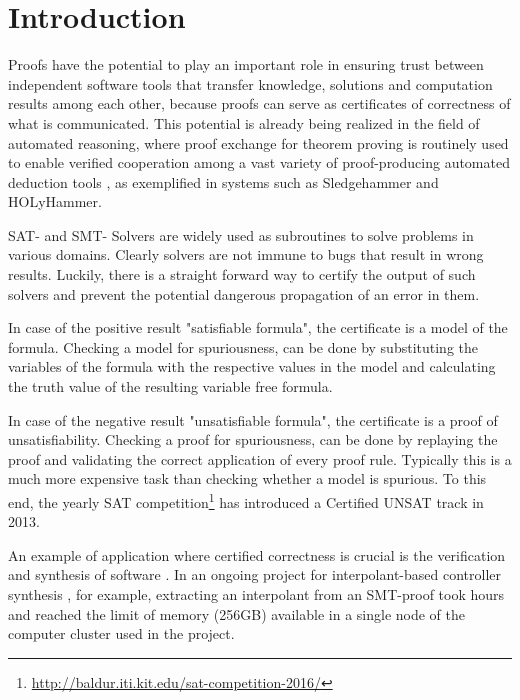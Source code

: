 \section{Introduction}

Proofs have the potential to play an important role in ensuring trust
between independent software tools that transfer knowledge, solutions
and computation results among each other, because proofs can serve as
certificates of correctness of what is communicated. This potential is
already being realized in the field of automated reasoning, where
proof exchange for theorem proving
\cite{PxTP2013,PxTP2015} is routinely used to
enable verified cooperation among a vast variety of proof-producing
automated deduction tools \cite{APPA}, as exemplified in systems such
as Sledgehammer \cite{paulson2010three} and
HOLyHammer\cite{zbMATH06419295}. 

SAT- and SMT- Solvers are widely used as subroutines to solve problems in various domains.
Clearly solvers are not immune to bugs \cite{brummayer2009fuzzing,brummayer2010automated} that result in wrong results.
Luckily, there is a straight forward way to certify the output of such solvers and 
prevent the potential dangerous propagation of an error in them.

In case of the positive result "satisfiable formula", the certificate is a model of the formula.
Checking a model for spuriousness, can be done by substituting the variables of the formula with the respective values in the model and 
calculating the truth value of the resulting variable free formula.

In case of the negative result "unsatisfiable formula", the certificate is a proof of unsatisfiability.
Checking a proof for spuriousness, can be done by replaying the proof and validating the correct application of every proof rule.
Typically this is a much more expensive task than checking whether a model is spurious.
To this end, the yearly SAT competition\footnote{\url{http://baldur.iti.kit.edu/sat-competition-2016/}} has introduced a Certified UNSAT track in 2013.

An example of application where certified correctness is crucial is the verification and synthesis of software \cite{Biere2009,Hofferek2013}. 
In an ongoing project for interpolant-based controller synthesis \cite{Hofferek2013}, 
for example, extracting an interpolant from an SMT-proof took hours and reached the limit of memory (256GB) available in a single node of the computer cluster used in the project. 

